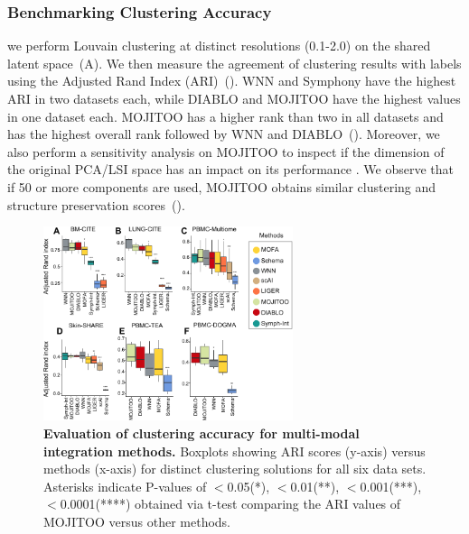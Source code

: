 \subsubsection{Benchmarking Clustering Accuracy}
we perform Louvain clustering at distinct resolutions (0.1-2.0) on the shared latent space~(A). We then measure the agreement of clustering results with labels using the Adjusted Rand Index (ARI)~(). WNN and Symphony have the highest ARI in two datasets each, while DIABLO and MOJITOO have the highest values in one dataset each. MOJITOO has a higher rank than two in all datasets and has the highest overall rank followed by WNN and DIABLO~(). Moreover, we also perform a sensitivity analysis on MOJITOO to inspect if the dimension of the original PCA/LSI space has an impact on its performance . We observe that if 50 or more components are used, MOJITOO obtains similar clustering and structure preservation scores~().
\begin{figure}[!ht]
	\centering
	\includegraphics[width=0.65\textwidth]{ari/fig}
	\vspace{0.1cm}
	\caption[Evaluation of clustering accuracy for multi-modal integration methods.]{
	\textbf{Evaluation of clustering accuracy for multi-modal integration methods.} Boxplots showing ARI scores (y-axis) versus methods (x-axis) for distinct clustering solutions for all six data sets. Asterisks indicate P-values of $<$0.05(*), $<$0.01(**), $<$0.001(***), $<$0.0001(****) obtained via t-test comparing the ARI values of MOJITOO versus other methods. }
	\label{fig:ari}
\end{figure}

